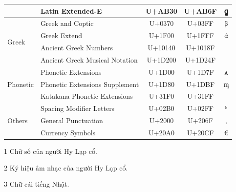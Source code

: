 \begin{table}[htb]
\begin{threeparttable}
\begin{tabular}{llccc}
                                           & Latin Extended-E                        & U+AB30                                      & U+AB6F                           & ꬶ \\\midrule
            \multirow{4}{*}{Greek}         & Greek and Coptic                        & U+0370                                      & U+03FF                           & β \\
                                           & Greek Extend                            & U+1F00                                      & U+1FFF                           & ἀ \\
                                           & Ancient Greek Numbers\tnote{1}          & U+10140                                     & U+1018F                          &   \\
                                           & Ancient Greek Musical Notation\tnote{2} & U+1D200                                     & U+1D24F                          &   \\\midrule
            \multirow{3}{*}{Phonetic}      & Phonetic Extensions                     & U+1D00                                      & U+1D7F                           & ᴀ \\
                                           & Phonetic Extensions Supplement          & U+1D80                                      & U+1DBF                           & ᶆ \\
                                           & Katakana Phonetic Extensions\tnote{3}   & U+31F0                                      & U+31FF                           &   \\\midrule
            \multirow{3}{*}{Others}        & Spacing Modifier Letters                & U+02B0                                      & U+02FF                           & ʰ \\
                                           & General Punctuation                     & U+2000                                      & U+206F                           & ‚ \\
                                           & Currency Symbols                        & U+20A0                                      & U+20CF                           & € \\
            \bottomrule
        \end{tabular}
        \begin{tablenotes}
            \item [1] Chữ số của người Hy Lạp cổ.
            \item [2] Ký hiệu âm nhạc của người Hy Lạp cổ.
            \item [3] Chữ cái tiếng Nhật.
        \end{tablenotes}
    \end{threeparttable}
\end{table}

